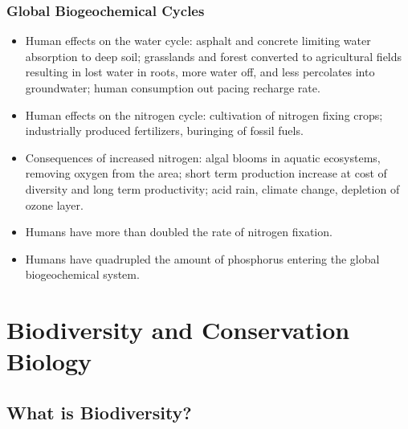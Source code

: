 \documentclass[12pt,a4paper]{article}
\begin{document}
\subsubsection{Global Biogeochemical Cycles}
\begin{itemize}
    \item Human effects on the water cycle: asphalt and concrete limiting water absorption to deep soil; grasslands and forest converted to agricultural fields resulting in lost water in roots, more water off, and less percolates into groundwater; human consumption out pacing recharge rate.
    \item Human effects on the nitrogen cycle: cultivation of nitrogen fixing crops; industrially produced fertilizers, buringing of fossil fuels.
    \item Consequences of increased nitrogen: algal blooms in aquatic ecosystems, removing oxygen from the area; short term production increase at cost of diversity and long term productivity; acid rain, climate change, depletion of ozone layer.
    \item Humans have more than doubled the rate of nitrogen fixation.
    \item Humans have quadrupled the amount of phosphorus entering the global biogeochemical system. 
\end{itemize}
\clearpage
\section{Biodiversity and Conservation Biology}
\subsection{What is Biodiversity?}
\end{document}
